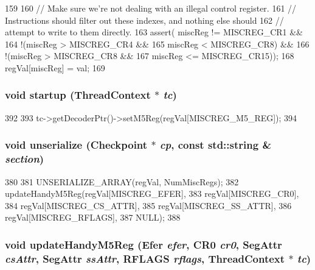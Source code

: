 \begin{DoxyCode}
159 {
160     // Make sure we're not dealing with an illegal control register.
161     // Instructions should filter out these indexes, and nothing else should
162     // attempt to write to them directly.
163     assert( miscReg != MISCREG_CR1 &&
164             !(miscReg > MISCREG_CR4 &&
165               miscReg < MISCREG_CR8) &&
166             !(miscReg > MISCREG_CR8 &&
167               miscReg <= MISCREG_CR15));
168     regVal[miscReg] = val;
169 }
\end{DoxyCode}
\hypertarget{classX86ISA_1_1ISA_a769e733729615c529fdb54f538f11dba}{
\subsubsection[{startup}]{\setlength{\rightskip}{0pt plus 5cm}void startup ({\bf ThreadContext} $\ast$ {\em tc})}}
\label{classX86ISA_1_1ISA_a769e733729615c529fdb54f538f11dba}



\begin{DoxyCode}
392 {
393     tc->getDecoderPtr()->setM5Reg(regVal[MISCREG_M5_REG]);
394 }
\end{DoxyCode}
\hypertarget{classX86ISA_1_1ISA_af22e5d6d660b97db37003ac61ac4ee49}{
\subsubsection[{unserialize}]{\setlength{\rightskip}{0pt plus 5cm}void unserialize ({\bf Checkpoint} $\ast$ {\em cp}, \/  const std::string \& {\em section})}}
\label{classX86ISA_1_1ISA_af22e5d6d660b97db37003ac61ac4ee49}



\begin{DoxyCode}
380 {
381     UNSERIALIZE_ARRAY(regVal, NumMiscRegs);
382     updateHandyM5Reg(regVal[MISCREG_EFER],
383                      regVal[MISCREG_CR0],
384                      regVal[MISCREG_CS_ATTR],
385                      regVal[MISCREG_SS_ATTR],
386                      regVal[MISCREG_RFLAGS],
387                      NULL);
388 }
\end{DoxyCode}
\hypertarget{classX86ISA_1_1ISA_a9ce2f376c572f07e3cc0851492e1ca25}{
\subsubsection[{updateHandyM5Reg}]{\setlength{\rightskip}{0pt plus 5cm}void updateHandyM5Reg (Efer {\em efer}, \/  CR0 {\em cr0}, \/  SegAttr {\em csAttr}, \/  SegAttr {\em ssAttr}, \/  RFLAGS {\em rflags}, \/  {\bf ThreadContext} $\ast$ {\em tc})}}
\label{classX86ISA_1_1ISA_a9ce2f376c572f07e3cc0851492e1ca25}



